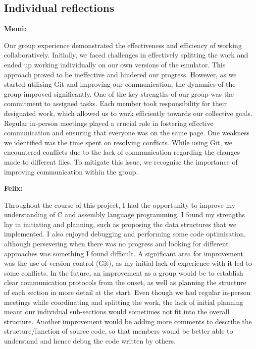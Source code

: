 \documentclass{article}
\begin{document}
\subsection{Individual reflections}

\textbf{Memi: }

Our group experience demonstrated the effectiveness and efficiency of working collaboratively. Initially, we faced challenges in effectively splitting the work and ended up working individually on our own versions of the emulator. This approach proved to be ineffective and hindered our progress. However, as we started utilising Git and improving our communication, the dynamics of the group improved significantly. One of the key strengths of our group was the commitment to assigned tasks. Each member took responsibility for their designated work, which allowed us to work efficiently towards our collective goals. Regular in-person meetings played a crucial role in fostering effective communication and ensuring that everyone was on the same page. One weakness we identified was the time spent on resolving conflicts. While using Git, we encountered conflicts due to the lack of communication regarding the changes made to different files. To mitigate this issue, we recognise the importance of improving communication within the group. 

\textbf{Felix:}

Throughout the course of this project, I had the opportunity to improve my understanding of C and assembly language programming. I found my strengths lay in initiating and planning, such as proposing the data structures that we implemented. I also enjoyed debugging and performing some code optimisation, although persevering when there was no progress and looking for different approaches was something I found difficult. A significant area for improvement was the use of version control (Git), as my initial lack of experience with it led to some conflicts. In the future, an improvement as a group would be to establish clear communication protocols from the onset, as well as planning the structure of each section in more detail at the start. Even though we had regular in-person meetings while coordinating and splitting the work, the lack of initial planning meant our individual sub-sections would sometimes not fit into the overall structure. Another improvement would be adding more comments to describe the structure/function of source code, so that members would be better able to understand and hence debug the code written by others. 
\end{document}
